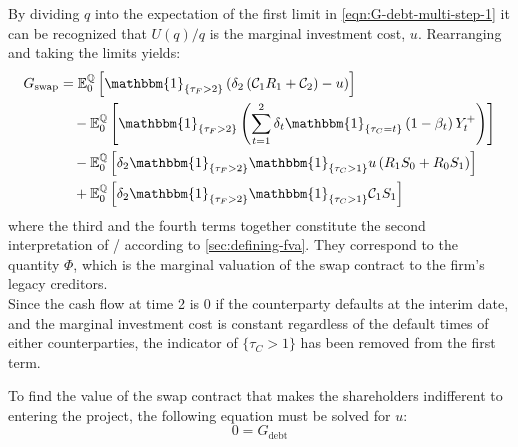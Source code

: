 \documentclass[main.tex]{subfiles}
\begin{document}
        By dividing $q$ into the expectation of the first limit in \cref{eqn:G-debt-multi-step-1}
        it can be recognized that $U(q)/q$ is the marginal investment cost, $u$.
        Rearranging and taking the limits yields:
        \begin{align}
            G_{\text{swap}} &= 
            \mathbb{E}_{0}^{\rnmeasure}\left[
                \mathbbm{1}_{\{\tau_{F}>2\}}
                \left(
                    \delta_{2} \left(\mathcal{C}_{1} R_{1} + \mathcal{C}_{2}\right) - u
                \right)
            \right]
            \nonumber
            \\
            &\quad-
            \mathbb{E}_{0}^{\rnmeasure}\left[
                \mathbbm{1}_{\{\tau_{F}>2\}}
                \left(
                    \sum_{t=1}^{2} \delta_{t} \mathbbm{1}_{\{\tau_{C}=t\}}\left(1-\beta_t\right)Y_{t}^{+}
                \right)
            \right]
            \nonumber
            \\
            &\quad-
            \mathbb{E}_{0}^{\rnmeasure}\left[
                \delta_2 \mathbbm{1}_{\{\tau_{F}>2\}} \mathbbm{1}_{\{\tau_{C}>1\}} u \left(
                    R_{1} S_{0} + R_{0} S_{1}
                \right)
            \right]
            \nonumber
            \\
            &\quad+
            \mathbb{E}_{0}^{\rnmeasure}\left[
                \delta_2 \mathbbm{1}_{\{\tau_{F}>2\}} \mathbbm{1}_{\{\tau_{C}>1\}}
                \mathcal{C}_{1} S_1
            \right]
            \label{eqn:shareholders-value-multi-period-swap}
        \end{align}
        where the third and the fourth terms together constitute the second interpretation of \FVA/ according to \cref{sec:defining-fva}.
        They correspond to the quantity $\Phi$, which is the marginal valuation of the swap contract to the firm's legacy creditors.
        \\
        Since the cash flow at time 2 is 0 if the counterparty defaults at the interim date,
        and the marginal investment cost is constant regardless of the default times of either counterparties,
        the indicator of $\{\tau_{C}>1\}$ has been removed from the first term.

        To find the value of the swap contract that makes the shareholders indifferent to entering the project,
        the following equation must be solved for $u$:
        \begin{equation*}
            0 = G_{\text{debt}}
        \end{equation*}
        
\end{document}
